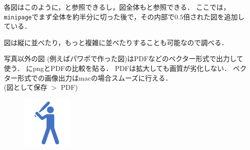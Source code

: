 各図はこのように，と参照できるし，図全体もと参照できる．
ここでは，\texttt{minipage}でまず全体を約半分に切った後で，その内部で$0.5$倍された図を追加している．

図は縦に並べたり，もっと複雑に並べたりすることも可能なので調べる．

\newpage
写真以外の図 (例えばパワポで作った図)はPDFなどのベクター形式で出力して使う．
にpngとPDFの比較を貼る．
PDFは拡大しても画質が劣化しない．
ベクター形式での画像出力はmacの場合スムーズに行える． \\(図として保存 $>$ PDF)

\begin{figure}[t]
    \centering
  \begin{minipage}{0.3\linewidth}
    \centering
    \includegraphics[clip, trim=0 0 0 0, width=0.9\linewidth]{figures/hit.png}
    \label{fig: png_img}
  \end{minipage}
  \begin{minipage}{0.3\linewidth}
    \centering

\end{minipage}
\end{figure}
